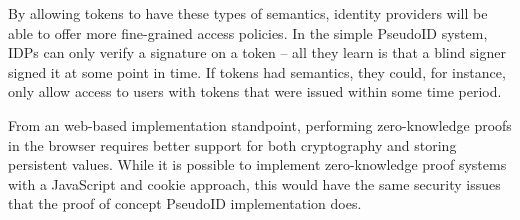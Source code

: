 \documentclass{llncs}
\begin{document}
By allowing tokens to have these types of semantics, identity
providers will be able to offer more fine-grained access policies. In
the simple PseudoID system, IDPs can only verify a signature on a
token -- all they learn is that a blind signer signed it at some point
in time. If tokens had semantics, they could, for instance, only allow
access to users with tokens that were issued within some time period.

From an web-based implementation standpoint, performing zero-knowledge
proofs in the browser requires better support for both cryptography
and storing persistent values. While it is possible to implement
zero-knowledge proof systems with a JavaScript and cookie approach,
this would have the same security issues that the proof of concept
PseudoID implementation does.



\end{document}
